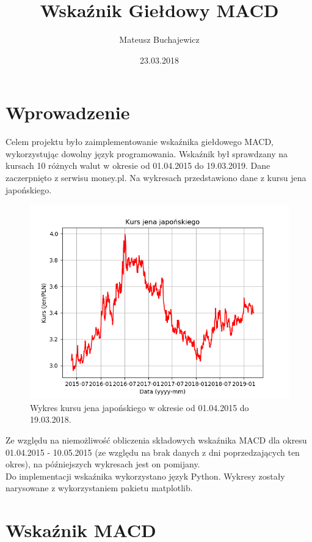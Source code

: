\documentclass{article} %
\title{Wskaźnik Giełdowy MACD}
\date{23.03.2018}
\author{Mateusz Buchajewicz}
\begin{document}
\maketitle
\section{Wprowadzenie}
Celem projektu było zaimplementowanie wskaźnika giełdowego MACD, wykorzystując dowolny język programowania.
Wskaźnik był sprawdzany na kursach 10 różnych walut w okresie od 01.04.2015 do 19.03.2019. 
Dane zaczerpnięto z serwisu money.pl. Na wykresach przedstawiono dane z kursu jena japońskiego. \\

\begin{figure}[h]
    \centering
    \includegraphics[scale=0.7]{wykres_kursu}
    \caption{Wykres kursu jena japońskiego w okresie od 01.04.2015 do 19.03.2018.}
\end{figure} 

Ze względu na niemożliwość obliczenia składowych wskaźnika MACD dla okresu 01.04.2015 - 10.05.2015
(ze względu na brak danych z dni poprzedzających ten okres), na późniejszych wykresach jest on pomijany. \\

Do implementacji wskaźnika wykorzystano język Python. Wykresy zostały narysowane z wykorzystaniem pakietu matplotlib.




\newpage

\section{Wskaźnik MACD}
\end{document}
